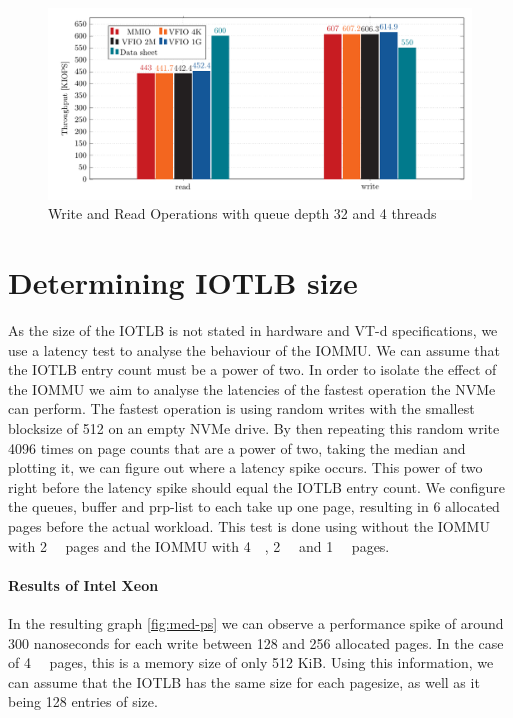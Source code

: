 \begin{figure}
    \centering
    \includegraphics[width=\textwidth]{figures/throughputqd32t1singlepage}
    \caption{Write and Read Operations with queue depth 32 and 4 threads}
    \label{fig:iopsq32t1sp}
\end{figure}

\section{Determining IOTLB size}
As the size of the IOTLB is not stated in hardware and VT-d specifications, we use a latency test to analyse the behaviour of the IOMMU. We can assume that the IOTLB entry count must be a power of two. In order to isolate the effect of the IOMMU we aim to analyse the latencies of the fastest operation the NVMe can perform. The fastest operation is using random writes with the smallest blocksize of \qty{512}{\byte} on an empty NVMe drive.
By then repeating this random write 4096 times on page counts that are a power of two, taking the median and plotting it, we can figure out where a latency spike occurs. This power of two right before the latency spike should equal the IOTLB entry count. We configure the queues, buffer and prp-list to each take up one page, resulting in 6 allocated pages before the actual workload. This test is done using without the IOMMU with \qty{2}{\mebi\byte} pages and the IOMMU with \qty{4}{\kibi\byte}, \qty{2}{\mebi\byte} and \qty{1}{\gibi\byte} pages.

\paragraph{Results of Intel Xeon}

In the resulting graph \autoref{fig:med-ps} we can observe a performance spike of around 300 nanoseconds for each write between 128 and 256 allocated pages. In the case of \qty{4}{\kibi\byte} pages, this is a memory size of only 512 KiB. Using this information, we can assume that the IOTLB has the same size for each pagesize, as well as it being 128 entries of size.

